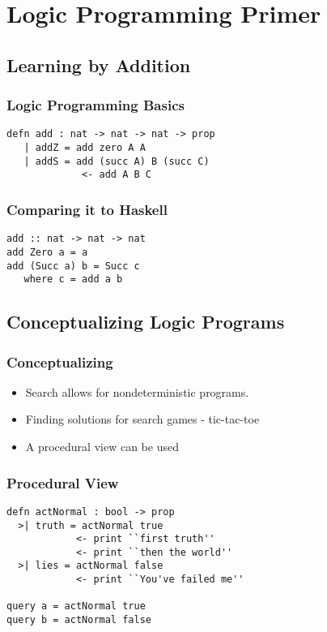 \section[Logic Primer]{Logic Programming Primer}

\subsection[Basics]{Learning by Addition}

\begin{frame}[fragile]
\frametitle{Logic Programming Basics}
\begin{lstlisting}
defn add : nat -> nat -> nat -> prop
   | addZ = add zero A A
   | addS = add (succ A) B (succ C) 
             <- add A B C
\end{lstlisting}
\end{frame}


\begin{frame}[fragile]
\frametitle{Comparing it to Haskell}

\begin{lstlisting}
add :: nat -> nat -> nat
add Zero a = a
add (Succ a) b = Succ c
   where c = add a b
\end{lstlisting}
\end{frame}

\subsection[Conceptualizing]{Conceptualizing Logic Programs}

\begin{frame}
\frametitle{Conceptualizing}
\begin{itemize}
\item Search allows for nondeterministic programs.
\item Finding solutions for search games - tic-tac-toe
\item A procedural view can be used
\end{itemize}
\end{frame}


\begin{frame}[fragile]
\frametitle{Procedural View}

\begin{lstlisting}
defn actNormal : bool -> prop
  >| truth = actNormal true 
            <- print ``first truth''
            <- print ``then the world''
  >| lies = actNormal false
            <- print ``You've failed me''

query a = actNormal true
query b = actNormal false
\end{lstlisting}
\end{frame}

